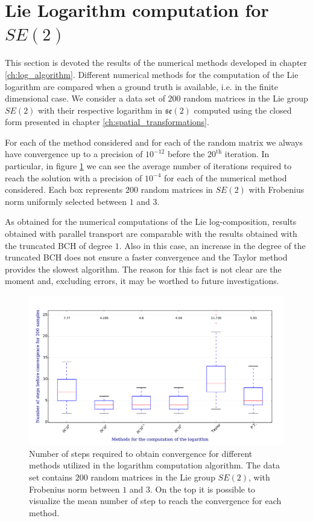 \section{Lie Logarithm computation for $SE(2)$}\label{se:results_lie_logarithm_computations}

This section is devoted the results of the numerical methods developed in chapter \ref{ch:log_algorithm}. Different numerical methods for the computation of the Lie logarithm are compared when a ground truth is available, i.e. in the finite dimensional case. We consider a data set of $200$ random matrices in the Lie group $SE(2)$ with their respective logarithm in $\mathfrak{se}(2)$ computed using the closed form presented in chapter \ref{ch:spatial_transformations}. 

For each of the method considered and for each of the random matrix we always have convergence up to a precision of $10^{-12}$ before the $20^{\text{th}}$ iteration.
In particular, in figure \ref{fig:log_computation_boxplot} we can see the average number of iterations required to reach the solution with a precision of $10^{-4}$ for each of the numerical method considered. Each box represents $200$ random matrices in $SE(2)$ with Frobenius norm uniformly selected between $1$ and $3$.

As obtained for the numerical computations of the Lie log-composition, results obtained with parallel transport are comparable with the results obtained with the truncated BCH of degree $1$. Also in this case, an increase in the degree of the truncated BCH does not ensure a faster convergence and the Taylor method provides the slowest algorithm. The reason for this fact is not clear are the moment and, excluding errors, it may be worthed to future investigations.

\begin{figure}[!ht]
	\hspace{-0.5cm}
	\includegraphics[scale=0.5]{figures/log_computation_boxplot.pdf}
	\caption{Number of steps required to obtain convergence for different methods utilized in the logarithm computation algorithm. The data set contains $200$ random matrices in the Lie group $SE(2)$, with Frobenius norm between $1$ and $3$. On the top it is possible to visualize the mean number of step to reach the convergence for each method.}
	\label{fig:log_computation_boxplot}
\end{figure}


